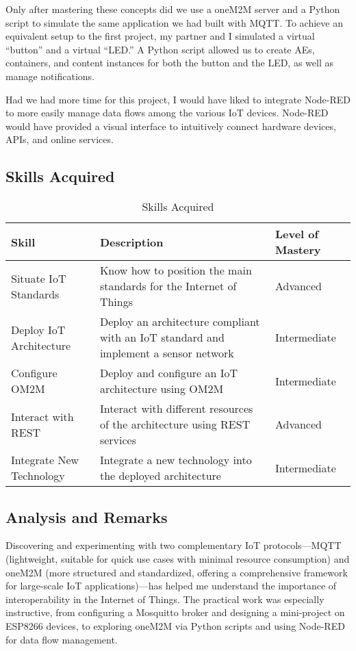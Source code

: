 Only after mastering these concepts did we use a oneM2M server and a Python script to simulate the same application we had built with MQTT. To achieve an equivalent setup to the first project, my partner and I simulated a virtual “button” and a virtual “LED.” A Python script allowed us to create AEs, containers, and content instances for both the button and the LED, as well as manage notifications. 

Had we had more time for this project, I would have liked to integrate Node-RED to more easily manage data flows among the various IoT devices. Node-RED would have provided a visual interface to intuitively connect hardware devices, APIs, and online services.

\subsection{Skills Acquired}
\begin{table}[H]
    \centering
    \begin{tabular}{|p{3.5cm}|p{8cm}|p{3.5cm}|}
    \hline
    \textbf{Skill} & \textbf{Description} & \textbf{Level of Mastery} \\
    \hline
    Situate IoT Standards & Know how to position the main standards for the Internet of Things & Advanced \\
    \hline
    Deploy IoT Architecture & Deploy an architecture compliant with an IoT standard and implement a sensor network & Intermediate \\
    \hline
    Configure OM2M & Deploy and configure an IoT architecture using OM2M & Intermediate \\
    \hline
    Interact with REST & Interact with different resources of the architecture using REST services & Advanced \\
    \hline
    Integrate New Technology & Integrate a new technology into the deployed architecture & Intermediate \\
    \hline
    \end{tabular}
    \caption{Skills Acquired}
    \label{tab:skills_acquired}
\end{table}

\subsection{Analysis and Remarks}
Discovering and experimenting with two complementary IoT protocols—MQTT (lightweight, suitable for quick use cases with minimal resource consumption) and oneM2M (more structured and standardized, offering a comprehensive framework for large-scale IoT applications)—has helped me understand the importance of interoperability in the Internet of Things. The practical work was especially instructive, from configuring a Mosquitto broker and designing a mini-project on ESP8266 devices, to exploring oneM2M via Python scripts and using Node-RED for data flow management.

